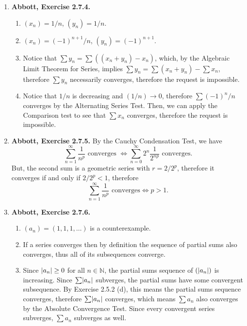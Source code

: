 \documentclass{article}
\DeclarePairedDelimiter\abs{\lvert}{\rvert}
\newcommand{\N}{\mathbb{N}}
\newcommand{\exc}[2][Abbott]{\item \textbf{#1, Exercise #2.}}
\begin{document}
\begin{enumerate}
    \exc{2.7.4}
    \begin{enumerate}
        \item $(x_n) = 1/n$, $(y_n) = 1/n$.
        
        \item $(x_n) = (-1)^{n+1}/n$, $(y_n) = (-1)^{n+1}$.
        
        \item Notice that $\sum y_n = \sum ((x_n + y_n) - x_n)$, which, by the Algebraic Limit Theorem for Series, implies $\sum y_n = \sum  (x_n + y_n) - \sum x_n$, therefore $\sum y_n$ necessarily converges, therefore the request is impossible.
        
        \item Notice that $1/n$ is decreasing and $(1/n) \to 0$, therefore $\sum (-1)^n/n$ converges by the Alternating Series Test. Then, we can apply the Comparison test to see that $\sum x_n$ converges, therefore the request is impossible.
    \end{enumerate}
    
    \exc{2.7.5} By the Cauchy Condensation Test, we have 
    \begin{equation*}
        \sum_{n=1}^\infty \frac{1}{n^p} \text{ converges } \iff 
        \sum_{n=0}^\infty 2^n \frac{1}{2^{n p}} \text{ converges.} 
    \end{equation*} But, the second sum is a geometric series with $r = 2/2^p$, therefore it converges if and only if $2/2^p < 1$, therefore 
    \begin{equation*}
        \sum_{n=1}^\infty \frac{1}{n^p} \text{ converges} \iff p > 1.
    \end{equation*}
    
    \exc{2.7.6}
    \begin{enumerate}
        \item $(a_n) = (1,1,1,\dots)$ is a counterexample.
        
        \item If a series converges then by definition the sequence of partial sums also converges, thus all of its subsequences converge.
        
        \item Since $\abs*{a_n} \geq 0$ for all $n \in \N$, the partial sums sequence of $(\abs*{a_n})$ is increasing. Since $\sum \abs*{a_n}$ subverges, the partial sums have some convergent subsequence. By Exercise 2.5.2 (d), this means the partial sums sequence converges, therefore $\sum \abs*{a_n}$ converges, which means $\sum a_n$ also converges by the Absolute Convergence Test. Since every convergent series subverges, $\sum a_n$ subverges as well.
        

\end{enumerate}
\end{enumerate}
\end{document}
